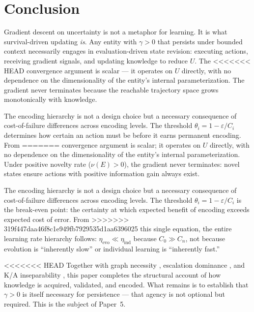 \documentclass[11pt]{article}
\theoremstyle{definition}
\begin{document}
\section{Conclusion}
\label{sec:conclusion}

Gradient descent on uncertainty is not a metaphor for learning. It is
what survival-driven updating \emph{is}. Any entity with $\gamma > 0$
that persists under bounded context necessarily engages in
evaluation-driven state revision: executing actions, receiving
gradient signals, and updating knowledge to reduce $U$. The
<<<<<<< HEAD
convergence argument is scalar --- it operates on $U$ directly, with
no dependence on the dimensionality of the entity's internal
parameterization. The gradient never terminates because the reachable
trajectory space grows monotonically with knowledge.

The encoding hierarchy is not a design choice but a necessary
consequence of cost-of-failure differences across encoding levels.
The threshold $\theta_i = 1 - \varepsilon / C_i$ determines how
certain an action must be before it earns permanent encoding. From
=======
convergence argument is scalar; it operates on $U$ directly, with
no dependence on the dimensionality of the entity's internal
parameterization. Under positive novelty rate ($\nu(E) > 0$), the gradient never
terminates: novel states ensure actions with positive information
gain always exist.

The encoding hierarchy is not a design choice but a necessary
consequence of cost-of-failure differences across encoding levels.
The threshold $\theta_i = 1 - \varepsilon / C_i$ is the break-even
point: the certainty at which expected benefit of encoding exceeds
expected cost of error. From
>>>>>>> 319f447daa46f8c1e949fb7929535d1aa6396025
this single equation, the entire learning rate hierarchy follows:
$\eta_{\mathrm{evo}} \ll \eta_{\mathrm{ind}}$ because
$C_0 \gg C_n$, not because evolution is ``inherently slow'' or
individual learning is ``inherently fast.''

<<<<<<< HEAD
Together with graph necessity \cite{McCarthy2026a}, escalation dominance
\cite{McCarthy2026b}, and K/A inseparability \cite{McCarthy2026c},
this paper completes the structural account of
how knowledge is acquired, validated, and encoded. What remains is to
establish that $\gamma > 0$ is itself necessary for persistence --- that
agency is not optional but required. This is the subject of Paper~5.
\end{document}
